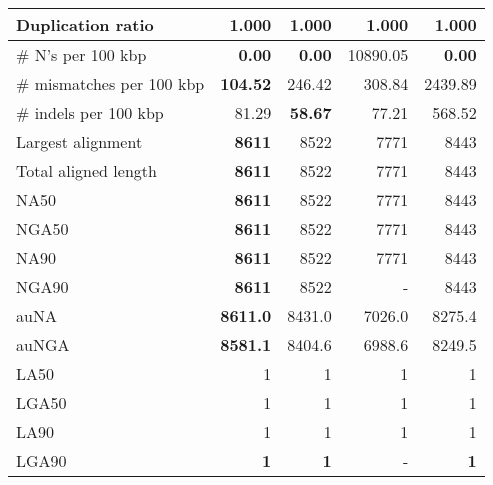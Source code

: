 \documentclass[12pt,a4paper]{article}
\begin{document}
\begin{table}[ht]
\begin{center}
\begin{tabular}{|l*{4}{|r}|}
Duplication ratio & 1.000 & 1.000 & 1.000 & 1.000 \\ \hline
\# N's per 100 kbp & {\bf 0.00} & {\bf 0.00} & 10890.05 & {\bf 0.00} \\ \hline
\# mismatches per 100 kbp & {\bf 104.52} & 246.42 & 308.84 & 2439.89 \\ \hline
\# indels per 100 kbp & 81.29 & {\bf 58.67} & 77.21 & 568.52 \\ \hline
Largest alignment & {\bf 8611} & 8522 & 7771 & 8443 \\ \hline
Total aligned length & {\bf 8611} & 8522 & 7771 & 8443 \\ \hline
NA50 & {\bf 8611} & 8522 & 7771 & 8443 \\ \hline
NGA50 & {\bf 8611} & 8522 & 7771 & 8443 \\ \hline
NA90 & {\bf 8611} & 8522 & 7771 & 8443 \\ \hline
NGA90 & {\bf 8611} & 8522 & - & 8443 \\ \hline
auNA & {\bf 8611.0} & 8431.0 & 7026.0 & 8275.4 \\ \hline
auNGA & {\bf 8581.1} & 8404.6 & 6988.6 & 8249.5 \\ \hline
LA50 & 1 & 1 & 1 & 1 \\ \hline
LGA50 & 1 & 1 & 1 & 1 \\ \hline
LA90 & 1 & 1 & 1 & 1 \\ \hline
LGA90 & {\bf 1} & {\bf 1} & - & {\bf 1} \\ \hline
\end{tabular}
\end{center}
\end{table}
\end{document}
